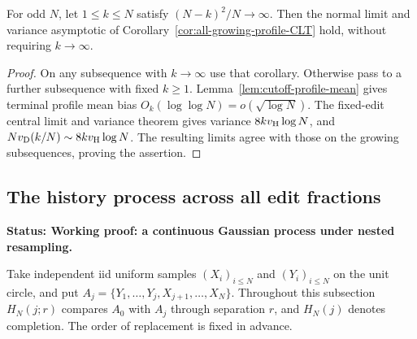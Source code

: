 \documentclass[11pt,letterpaper]{article}
\newcommand{\status}[1]{\textbf{Status: #1.}}
\begin{document}
\begin{corollary}
\label{cor:all-nonzero-profile-CLT}
For odd $N$, let $1\le k\le N$ satisfy
$(N-k)^2/N\to\infty$.
Then the normal limit and variance asymptotic of
Corollary~\ref{cor:all-growing-profile-CLT} hold, without
requiring $k\to\infty$.
\end{corollary}
\begin{proof}
On any subsequence with $k\to\infty$ use that corollary.
Otherwise pass to a further subsequence with fixed
$k\ge1$. Lemma~\ref{lem:cutoff-profile-mean} gives terminal
profile mean bias $O_k(\log\log N)=o(\sqrt{\log N})$.
The fixed-edit central limit and variance theorem gives
variance $8kv_{\rm H}\log N$, and
$Nv_{\rm D}(k/N)\sim8kv_{\rm H}\log N$.
The resulting limits agree with those on the growing
subsequences, proving the assertion.
\end{proof}

\subsection{The history process across all edit fractions}
\label{sec:dense-history-process}

\status{Working proof: a continuous Gaussian process under nested resampling}

Take independent iid uniform samples $(X_i)_{i\le N}$ and
$(Y_i)_{i\le N}$ on the unit circle, and put
$A_j=\{Y_1,\ldots,Y_j,X_{j+1},\ldots,X_N\}$.
Throughout this subsection $H_N(j;r)$ compares $A_0$ with
$A_j$ through separation $r$, and $H_N(j)$ denotes completion.
The order of replacement is fixed in advance.
\end{document}
